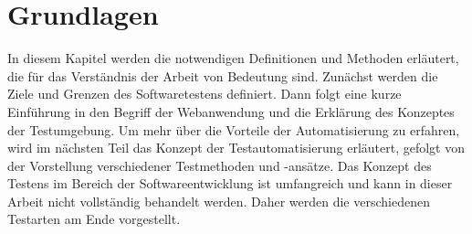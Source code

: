 \chapter{Grundlagen}\label{ch:grundlagen}

In diesem Kapitel werden die notwendigen Definitionen und Methoden erläutert,
die für das Verständnis der Arbeit von Bedeutung sind. Zunächst werden die
Ziele und Grenzen des Softwaretestens definiert. Dann folgt eine kurze
Einführung in den Begriff der Webanwendung und  die Erklärung des Konzeptes
der Testumgebung. Um mehr über die Vorteile der Automatisierung zu erfahren,
wird im nächsten Teil das Konzept der Testautomatisierung erläutert, gefolgt
von der Vorstellung verschiedener Testmethoden und -ansätze. Das Konzept des
Testens im Bereich der Softwareentwicklung ist umfangreich und kann in dieser
Arbeit nicht vollständig behandelt werden. Daher werden die verschiedenen
Testarten am Ende vorgestellt.










